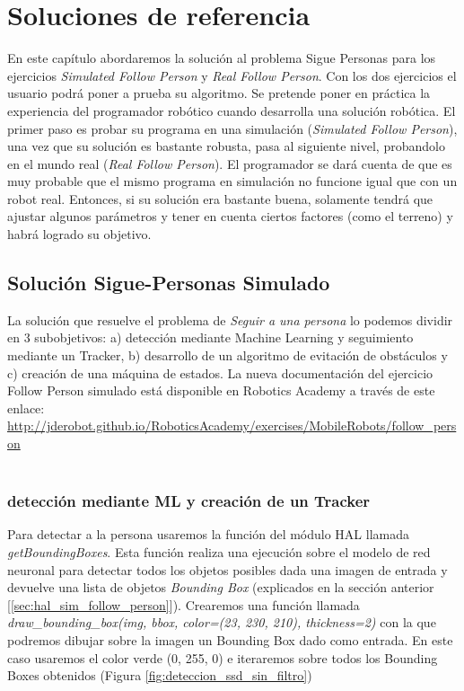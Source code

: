 \chapter{Soluciones de referencia}
\label{cap:capitulo6}

En este capítulo abordaremos la solución al problema Sigue Personas para los ejercicios \textit{Simulated Follow Person} y \textit{Real Follow Person}. Con los dos ejercicios el usuario podrá poner a prueba su algoritmo. Se pretende poner en práctica la experiencia del programador robótico cuando desarrolla una solución robótica. El primer paso es probar su programa en una simulación (\textit{Simulated Follow Person}), una vez que su solución es bastante robusta, pasa al siguiente nivel, probandolo en el mundo real (\textit{Real Follow Person}). El programador se dará cuenta de que es muy probable que el mismo programa en simulación no funcione igual que con un robot real. Entonces, si su solución era bastante buena, solamente tendrá que ajustar algunos parámetros y tener en cuenta ciertos factores (como el terreno) y habrá logrado su objetivo.\\

\section{Solución Sigue-Personas Simulado}
\label{sec:solucion_sigue_personas_simulado}

La solución que resuelve el problema de \textit{Seguir a una persona} lo podemos dividir en 3 subobjetivos: a) detección mediante Machine Learning y seguimiento mediante un Tracker, b) desarrollo de un algoritmo de evitación de obstáculos y c) creación de una máquina de estados. La nueva documentación del ejercicio Follow Person simulado está disponible en Robotics Academy a través de este enlace: \url{http://jderobot.github.io/RoboticsAcademy/exercises/MobileRobots/follow_person}\\\\



\subsection{detección mediante ML y creación de un Tracker}
\label{subsec:ml_tracker}
Para detectar a la persona usaremos la función del módulo HAL llamada \textit{getBoundingBoxes}. Esta función realiza una ejecución sobre el modelo de red neuronal para detectar todos los objetos posibles dada una imagen de entrada y devuelve una lista de objetos \textit{Bounding Box} (explicados en la sección anterior [\ref{sec:hal_sim_follow_person}]). Crearemos una función llamada \textit{draw\_bounding\_box(img, bbox, color=(23, 230, 210), thickness=2)} con la que podremos dibujar sobre la imagen un Bounding Box dado como entrada. En este caso usaremos el color verde (0, 255, 0) e iteraremos sobre todos los Bounding Boxes obtenidos (Figura \ref{fig:deteccion_ssd_sin_filtro})\\

